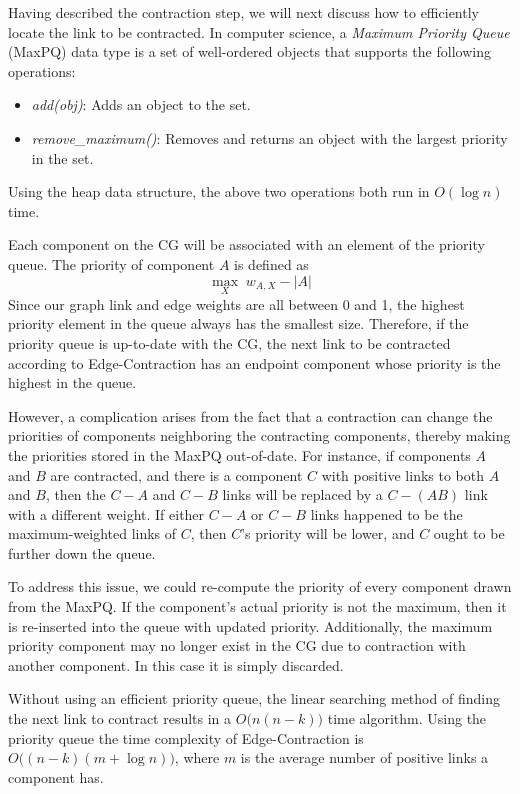 Having described the contraction step, we will next discuss how to
efficiently locate the link to be contracted.
In computer science, a \textit{Maximum Priority Queue} (MaxPQ) data
type is a set of well-ordered objects that supports the following
operations:

\begin{itemize}
\item
\textit{add(obj)}: Adds an object to the set.

\item
\textit{remove\_maximum()}: Removes and returns an object with the
largest priority in the set.
\end{itemize}

Using the heap data structure, the above two operations both run in
$O(\log n)$ time.

Each component on the CG will be associated with an element of the
priority queue. The priority of component $A$ is defined as
\[ \max_{X}\;w_{A,X} - |A| \]
Since our graph link and edge weights are all between 0 and 1, the
highest priority element in the queue always has the smallest size.
Therefore, if the priority queue is up-to-date with the CG, the
next link to be contracted according to Edge-Contraction has
an endpoint component whose priority is the highest in the queue.

However, a complication arises from the fact that a contraction can
change the priorities of components neighboring the contracting
components, thereby making the priorities stored in the MaxPQ
out-of-date. For instance, if components $A$ and $B$ are contracted, and
there is a component $C$ with positive links to both $A$ and $B$, then
the $C-A$ and $C-B$ links will be replaced by a $C-(AB)$ link with a
different weight. If either $C-A$ or $C-B$ links happened to be the
maximum-weighted links of $C$, then $C$'s priority will be lower,
and $C$ ought to be further down the queue.

To address this issue, we could re-compute the priority of every
component drawn from the MaxPQ. If the component's actual priority is
not the maximum, then it is re-inserted into the queue with updated
priority. Additionally, the maximum priority component may no longer
exist in the CG due to contraction with another component. In this case
it is simply discarded.

Without using an efficient priority queue, the linear searching method
of finding the next link to contract results in a $O\big(n (n-k)\big)$
time algorithm. Using the priority queue the time complexity of
Edge-Contraction is $O \big((n - k) (m + \log n)\big)$, where $m$ is
the average number of positive links a component has.

